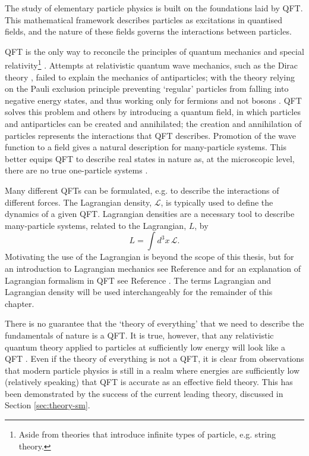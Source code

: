 
The study of elementary particle physics is built on the foundations laid by
\ac{QFT}. This mathematical framework describes particles as excitations in
quantised fields, and the nature of these fields governs the interactions
between particles.

\ac{QFT} is the only way to reconcile the principles of quantum mechanics and
special relativity\footnote{
  Aside from theories that introduce infinite types of particle, e.g. string
  theory.
}
\cite{Weinberg1995}. Attempts at relativistic quantum wave mechanics, such as
the Dirac theory \cite{Dirac1930}, failed to explain the mechanics of
antiparticles; with the theory relying on the Pauli exclusion principle
\cite{Pauli1925} preventing `regular' particles from falling into negative
energy states, and thus working only for fermions and not bosons
\cite[p.14]{Weinberg1995}.  \ac{QFT} solves this problem and others by
introducing a quantum field, in which particles and antiparticles can be created
and annihilated; the creation and annihilation of particles represents the
interactions that \ac{QFT} describes.
Promotion of the wave function to a field gives a natural description for
many-particle systems. This better equips QFT to describe real states in nature
as, at the microscopic level, there are no true one-particle systems
\cite{Weisskopf1981}.

\newcommand\Lden{\ensuremath{\mathcal{L}}\xspace}
Many different \acp{QFT} can be formulated, e.g. to describe the interactions
of different forces. The Lagrangian density, \Lden, is typically used to define
the dynamics of a given \ac{QFT}. Lagrangian densities are a necessary tool to
describe many-particle systems, related to the Lagrangian, $L$, by
%
\begin{equation*}
  L = \int d^3x \, \Lden .
\end{equation*}
Motivating the use of the Lagrangian is beyond the scope of this thesis, but for
an introduction to Lagrangian mechanics see Reference
\cite[pp.461-3]{Thomson2013} and for an explanation of Lagrangian formalism in
\ac{QFT} see Reference \cite[pp.298-306]{Weinberg1995}. The terms Lagrangian and
Lagrangian density will be used interchangeably for the remainder of this
chapter.

There is no guarantee that the `theory of everything' that we need to describe
the fundamentals of nature is a \ac{QFT}. It is true, however, that any
relativistic quantum theory applied to particles at sufficiently low energy will
look like a \ac{QFT} \cite{Weinberg1995}. Even if the theory of everything is
not a \ac{QFT}, it is clear from observations that modern particle physics is
still in a realm where energies are sufficiently low (relatively speaking) that
\ac{QFT} is accurate as an effective field theory. This has been demonstrated by
the success of the current leading theory, discussed in Section
\ref{sec:theory-sm}.

